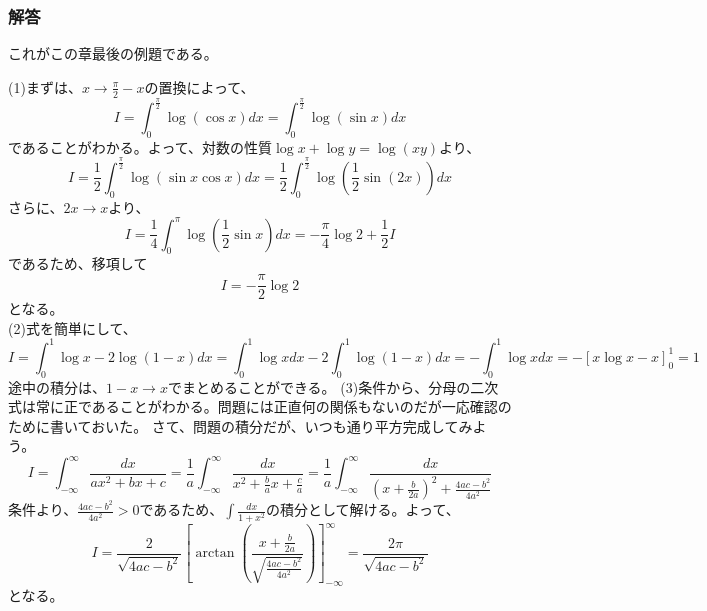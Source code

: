 \documentclass[a4j,dvipdfmx]{jsarticle}
\begin{document}
\subsubsection*{解答}
これがこの章最後の例題である。

(1)まずは、$x\to\frac{\pi}{2}-x$の置換によって、
\begin{equation*}
    I=\int_0^\frac{\pi}{2}\log(\cos x)dx=\int_0^\frac{\pi}{2}\log(\sin x)dx
\end{equation*}
であることがわかる。よって、対数の性質$\log x+\log y=\log(xy)$より、
\begin{equation*}
    I=\frac{1}{2}\int_0^\frac{\pi}{2}\log(\sin x\cos x)dx=\frac{1}{2}\int_0^\frac{\pi}{2}\log(\frac{1}{2}\sin(2x))dx
\end{equation*}
さらに、$2x\to x$より、
\begin{equation*}
    I=\frac{1}{4}\int_0^\pi \log(\frac{1}{2}\sin x)dx=-\frac{\pi}{4}\log 2+\frac{1}{2}I
\end{equation*}
であるため、移項して
\begin{equation*}
    I=-\frac{\pi}{2}\log 2
\end{equation*}
となる。\\

(2)式を簡単にして、
\begin{equation*}
    I=\int_0^1 \log x -2\log(1-x)dx=\int_0^1 \log x dx -2\int_0^1 \log(1-x)dx=-\int_0^1\log xdx
    =-\left[x\log x- x\right]_0^1=1
\end{equation*}
途中の積分は、$1-x\to x$でまとめることができる。
\newpage
(3)条件から、分母の二次式は常に正であることがわかる。問題には正直何の関係もないのだが一応確認のために書いておいた。
さて、問題の積分だが、いつも通り平方完成してみよう。
\begin{equation*}
    I=\int_{-\infty}^{\infty}\frac{dx}{ax^2+bx+c}=\frac{1}{a}\int_{-\infty}^{\infty}\frac{dx}{x^2+\frac{b}{a}x+\frac{c}{a}}=\frac{1}{a}\int_{-\infty}^{\infty}\frac{dx}{(x+\frac{b}{2a})^2+\frac{4ac-b^2}{4a^2}}
\end{equation*}
条件より、$\displaystyle\frac{4ac-b^2}{4a^2}>0$であるため、$\displaystyle \int\frac{dx}{1+x^2}$の積分として解ける。よって、
\begin{equation*}
    I=\frac{2}{\sqrt{4ac-b^2}}\left[\arctan\left(\frac{x+\frac{b}{2a}}{\sqrt{\frac{4ac-b^2}{4a^2}}}\right)\right]_{-\infty}^\infty=\frac{2\pi}{\sqrt{4ac-b^2}}
\end{equation*}
となる。
\newpage
\end{document}
